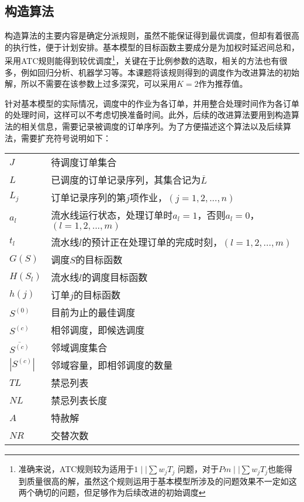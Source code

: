 \subsection{构造算法}
构造算法的主要内容是确定分派规则，虽然不能保证得到最优调度，但却有着很高的执行性，便于计划安排。基本模型的目标函数主要成分是为加权时延迟间总和，采用ATC规则能得到较优调度\footnote{准确来说，ATC规则较为适用于$1\mid\mid \sum w_jT_j$ 问题，对于$Pm\mid\mid \sum w_jT_j$也能得到质量很高的解，虽然这个规则运用于基本模型所涉及的问题效果不一定如这两个确切的问题，但足够作为后续改进的初始调度}，关键在于比例参数的选取，相关的方法也有很多，例如回归分析、机器学习等。本课题将该规则得到的调度作为改进算法的初始解，所以不需要在该参数上过多深究，可以采用$K = 2$作为推荐值\cite{bilge2007tabu}。

针对基本模型的实际情况，调度中的作业为各订单，并用整合处理时间作为各订单的处理时间，这样可以不考虑切换准备时间。此外，后续的改进算法要用到构造算法的相关信息，需要记录被调度的订单序列。为了方便描述这个算法以及后续算法，需要扩充符号说明如下：

\begin{supertabular}{ll}
$J$ & 待调度订单集合\\
$L$ & 已调度的订单记录序列，其集合记为$\overline{L}$\\
$L_j$ & 订单记录序列的第$j$项作业，$(j = 1,2,...,n)$\\
$a_l$ & 流水线运行状态，处理订单时$a_l = 1$，否则$a_l = 0$，$(l = 1,2,...,m)$\\
$t_l$ & 流水线$l$的预计正在处理订单的完成时刻，$(l = 1,2,...,m)$\\
$G(S)$& 调度$S$的目标函数\\
$H(S_l)$ & 流水线$l$的调度目标函数\\
$h(j)$ & 订单$j$的目标函数\\
$S^{(0)}$ & 目前为止的最佳调度\\
$S^{(c)}$& 相邻调度，即候选调度\\
$\overline{S^{(c)}}$& 邻域调度集合\\
$|S^{(c)}|$& 邻域容量，即相邻调度的数量\\
$TL$ & 禁忌列表\\
$NL$ &禁忌列表长度\\
$A$ & 特赦解\\
$NR$ &交替次数\\
\end{supertabular}

